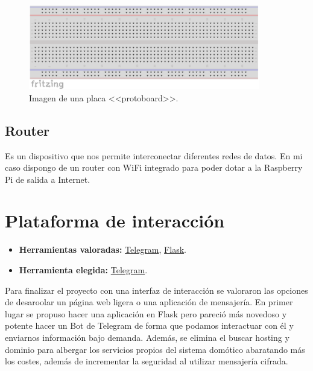 \begin{figure}
    \centering
    \includegraphics[width=0.9\textwidth]{img/protoboard.pdf}
    \caption{Imagen de una placa <<protoboard>>. } \label{Img:Protoboard}
\end{figure}

\subsection{Router}\label{4:Router}
Es un dispositivo que nos permite interconectar diferentes redes de datos. En mi caso dispongo de un router con WiFi integrado para poder dotar a la Raspberry Pi de salida a Internet.

\section{Plataforma de interacción}\label{4:telegram}
\begin{itemize}
    \item \textbf{Herramientas valoradas:} \href{https://telegram.org/}{Telegram}, \href{https://palletsprojects.com/p/flask/}{Flask}.
    \item \textbf{Herramienta elegida:} \href{https://telegram.org/}{Telegram}.
\end{itemize}
Para finalizar el proyecto con una interfaz de interacción se valoraron las opciones de desaroolar un página web ligera o una aplicación de mensajería.
En primer lugar se propuso hacer una aplicación en Flask pero pareció más novedoso y potente hacer un Bot de Telegram de forma que podamos interactuar con él y enviarnos información bajo demanda. Además, se elimina el buscar hosting y dominio para albergar los servicios propios del sistema domótico abaratando más los costes, además de incrementar la seguridad al utilizar mensajería cifrada.

